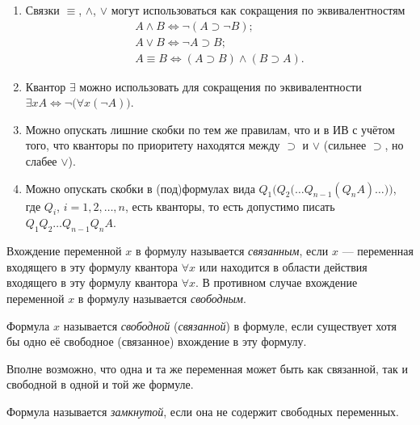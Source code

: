 \begin{remark*}\leavevmode
    \begin{enumerate}
        \item Связки $\equiv$, $\land$, $\lor$ могут использоваться как сокращения по эквивалентностям
        \begin{gather*}
            A \land B \Longleftrightarrow \neg(A \supset \neg B); \\
            A \lor B \Longleftrightarrow \neg A \supset B; \\
            A \equiv B \Longleftrightarrow (A \supset B)\land(B \supset A).
        \end{gather*}

        \item Квантор $\exists$ можно использовать для сокращения по эквивалентности $\exists xA \Longleftrightarrow \neg\big(\forall x(\neg A)\big)$.

        \item Можно опускать лишние скобки по тем же правилам, что и в ИВ с учётом того, что кванторы по приоритету находятся между $\supset$ и $\lor$ (сильнее $\supset$, но слабее $\lor$).

        \item Можно опускать скобки в (под)формулах вида $Q_1\Big(Q_2\big(\dots Q_{n - 1}(Q_nA)\dots\big)\Big)$, где $Q_i$, $i = 1, 2, \dots, n$, есть кванторы, то есть допустимо писать $Q_1Q_2\dots Q_{n - 1}Q_nA$.
    \end{enumerate}
\end{remark*}

\begin{definition*}
    Вхождение переменной $x$ в формулу называется \textit{связанным}, если $x$ --- переменная входящего в эту формулу квантора $\forall x$ или находится в области действия входящего в эту формулу квантора $\forall x$. В противном случае вхождение переменной $x$ в формулу называется \textit{свободным}.
\end{definition*}

\begin{definition*}
    Формула $x$ называется \textit{свободной} (\textit{связанной}) в формуле, если существует хотя бы одно её свободное (связанное) вхождение в эту формулу.
\end{definition*}
Вполне возможно, что одна и та же переменная может быть как связанной, так и свободной в одной и той же формуле.

\begin{definition*}
    Формула называется \textit{замкнутой}, если она не содержит свободных переменных.
\end{definition*}
